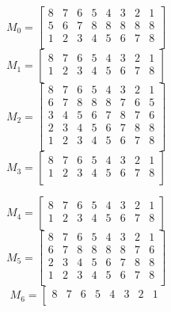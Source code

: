\documentclass{llncs}
\begin{document}
\begin{figure}[htb]
\centering
{\small
\begin{minipage}[]{0.2\linewidth}
$$ M_{0} = \left[ \begin{array}{cccccccc}
8 & 7 & 6 & 5 & 4 & 3 & 2 & 1\\
5 & 6 & 7 & 8 & 8 & 8 & 8 & 8\\
1 & 2 & 3 & 4 & 5 & 6 & 7 & 8\\
\end{array} \right] $$
$$ M_{1} = \left[ \begin{array}{cccccccc}
8 & 7 & 6 & 5 & 4 & 3 & 2 & 1\\
1 & 2 & 3 & 4 & 5 & 6 & 7 & 8\\
\end{array} \right] $$
$$ M_{2} = \left[ \begin{array}{cccccccc}
8 & 7 & 6 & 5 & 4 & 3 & 2 & 1\\
6 & 7 & 8 & 8 & 8 & 7 & 6 & 5\\
3 & 4 & 5 & 6 & 7 & 8 & 7 & 6\\
2 & 3 & 4 & 5 & 6 & 7 & 8 & 8\\
1 & 2 & 3 & 4 & 5 & 6 & 7 & 8\\
\end{array} \right] $$
$$ M_{3} = \left[ \begin{array}{cccccccc}
8 & 7 & 6 & 5 & 4 & 3 & 2 & 1\\
1 & 2 & 3 & 4 & 5 & 6 & 7 & 8\\
\end{array} \right] $$
\end{minipage}
\hspace{0.5cm}
\begin{minipage}[]{0.2\linewidth}
$$ M_{4} = \left[ \begin{array}{cccccccc}
8 & 7 & 6 & 5 & 4 & 3 & 2 & 1\\
1 & 2 & 3 & 4 & 5 & 6 & 7 & 8\\
\end{array} \right] $$
$$ M_{5} = \left[ \begin{array}{cccccccc}
8 & 7 & 6 & 5 & 4 & 3 & 2 & 1\\
6 & 7 & 8 & 8 & 8 & 8 & 7 & 6\\
2 & 3 & 4 & 5 & 6 & 7 & 8 & 8\\
1 & 2 & 3 & 4 & 5 & 6 & 7 & 8\\
\end{array} \right] $$
$$ M_{6} = \left[ \begin{array}{cccccccc}
8 & 7 & 6 & 5 & 4 & 3 & 2 & 1\\

\end{array}$$
\end{minipage}}
\end{figure}
\end{document}

